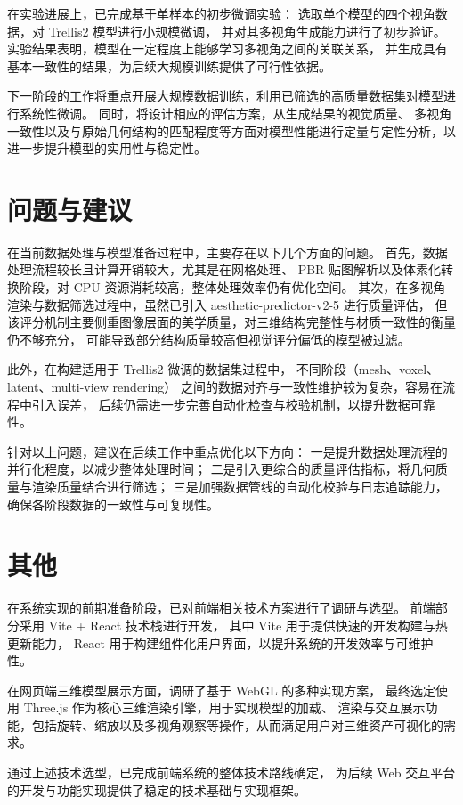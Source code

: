 在实验进展上，已完成基于单样本的初步微调实验：
选取单个模型的四个视角数据，对 Trellis2 模型进行小规模微调，
并对其多视角生成能力进行了初步验证。实验结果表明，模型在一定程度上能够学习多视角之间的关联关系，
并生成具有基本一致性的结果，为后续大规模训练提供了可行性依据。

下一阶段的工作将重点开展大规模数据训练，利用已筛选的高质量数据集对模型进行系统性微调。
同时，将设计相应的评估方案，从生成结果的视觉质量、
多视角一致性以及与原始几何结构的匹配程度等方面对模型性能进行定量与定性分析，以进一步提升模型的实用性与稳定性。

\section{问题与建议}
在当前数据处理与模型准备过程中，主要存在以下几个方面的问题。
首先，数据处理流程较长且计算开销较大，尤其是在网格处理、
PBR 贴图解析以及体素化转换阶段，对 CPU 资源消耗较高，整体处理效率仍有优化空间。
其次，在多视角渲染与数据筛选过程中，虽然已引入 aesthetic-predictor-v2-5 进行质量评估，
但该评分机制主要侧重图像层面的美学质量，对三维结构完整性与材质一致性的衡量仍不够充分，
可能导致部分结构质量较高但视觉评分偏低的模型被过滤。

此外，在构建适用于 Trellis2 微调的数据集过程中，
不同阶段（mesh、voxel、latent、multi-view rendering）
之间的数据对齐与一致性维护较为复杂，容易在流程中引入误差，
后续仍需进一步完善自动化检查与校验机制，以提升数据可靠性。

针对以上问题，建议在后续工作中重点优化以下方向：
一是提升数据处理流程的并行化程度，以减少整体处理时间；
二是引入更综合的质量评估指标，将几何质量与渲染质量结合进行筛选；
三是加强数据管线的自动化校验与日志追踪能力，确保各阶段数据的一致性与可复现性。

\section{其他}
在系统实现的前期准备阶段，已对前端相关技术方案进行了调研与选型。
前端部分采用 Vite + React 技术栈进行开发，
其中 Vite 用于提供快速的开发构建与热更新能力，
React 用于构建组件化用户界面，以提升系统的开发效率与可维护性。

在网页端三维模型展示方面，调研了基于 WebGL 的多种实现方案，
最终选定使用 Three.js 作为核心三维渲染引擎，用于实现模型的加载、
渲染与交互展示功能，包括旋转、缩放以及多视角观察等操作，从而满足用户对三维资产可视化的需求。

通过上述技术选型，已完成前端系统的整体技术路线确定，
为后续 Web 交互平台的开发与功能实现提供了稳定的技术基础与实现框架。
